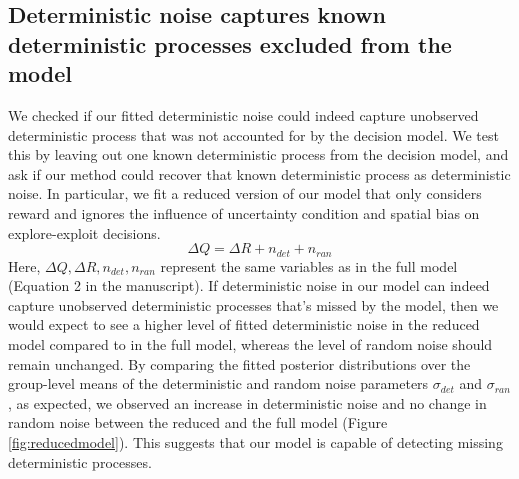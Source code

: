 \documentclass[12pt]{article}
\begin{document}
	\subsection{Deterministic noise captures known deterministic processes excluded from the model}	
	We checked if our fitted deterministic noise could indeed capture unobserved deterministic process that was not accounted for by the decision model. We test this by leaving out one known deterministic process from the decision model, and ask if our method could recover that known deterministic process as deterministic noise. In particular, we fit a reduced version of our model that only considers reward and ignores the influence of uncertainty condition and spatial bias on explore-exploit decisions.  
	$$\Delta Q= \Delta R+n_{det}+n_{ran}$$
	Here, $\Delta Q, \Delta R, n_{det}, n_{ran}$ represent the same variables as in the full model (Equation 2 in the manuscript).	If deterministic noise in our model can indeed capture unobserved deterministic processes that's missed by the model, then we would expect to see a higher level of fitted deterministic noise in the reduced model compared to in the full model, whereas the level of random noise should remain unchanged. By comparing the	fitted posterior distributions over the group-level means of the deterministic and random noise parameters $\sigma_{det}$ and $\sigma_{ran}$, as expected, we observed an increase in deterministic noise and no change in random noise between the reduced and the full model (Figure \ref{fig:reducedmodel}). This suggests that our model is capable of detecting missing deterministic processes.
	
\end{document}
